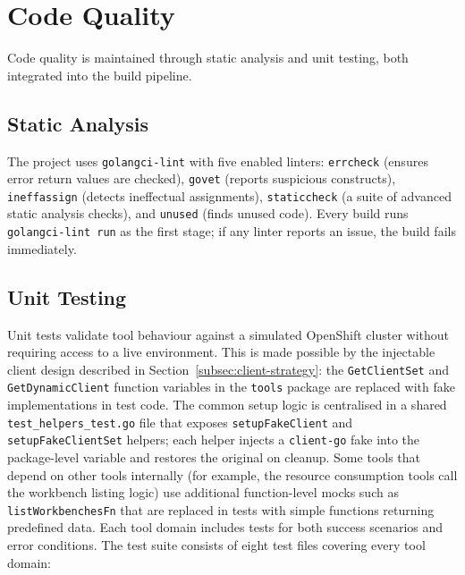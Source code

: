 \documentclass[
  digital,     %
  oneside,     %
  nosansbold,  %
  nocolorbold, %
  lof,         %
  lot,         %
]{fithesis4}
\begin{document}
\section{Code Quality}
\label{sec:code-quality}

Code quality is maintained through static analysis and unit testing, both
integrated into the build pipeline.

\subsection{Static Analysis}
\label{subsec:static-analysis}

The project uses \texttt{golangci-lint} with five enabled linters:
\texttt{errcheck} (ensures error return values are checked),
\texttt{govet} (reports suspicious constructs),
\texttt{ineffassign} (detects ineffectual assignments),
\texttt{staticcheck} (a suite of advanced static analysis checks), and
\texttt{unused} (finds unused code). Every build runs
\texttt{golangci-lint run} as the first stage; if any linter reports an
issue, the build fails immediately.

\subsection{Unit Testing}
\label{subsec:unit-testing}

Unit tests validate tool behaviour against a simulated OpenShift cluster
without requiring access to a live environment. This is made possible by
the injectable client design described in
Section~\ref{subsec:client-strategy}: the \texttt{GetClientSet} and
\texttt{GetDynamicClient} function variables in the \texttt{tools} package
are replaced with fake implementations in test code. The common setup
logic is centralised in a shared \texttt{test\_helpers\_test.go} file that exposes
\texttt{setupFakeClient} and \texttt{setupFakeClientSet} helpers; each
helper injects a \texttt{client-go} fake into the package-level variable
and restores the original on cleanup. Some tools that depend on other
tools internally (for example, the resource consumption tools call the
workbench listing logic) use additional function-level mocks such as
\texttt{listWorkbenchesFn} that are replaced in tests with simple
functions returning predefined data. Each tool domain includes tests for both success scenarios and error conditions.
The test suite consists of eight test files covering every tool domain:
\end{document}
